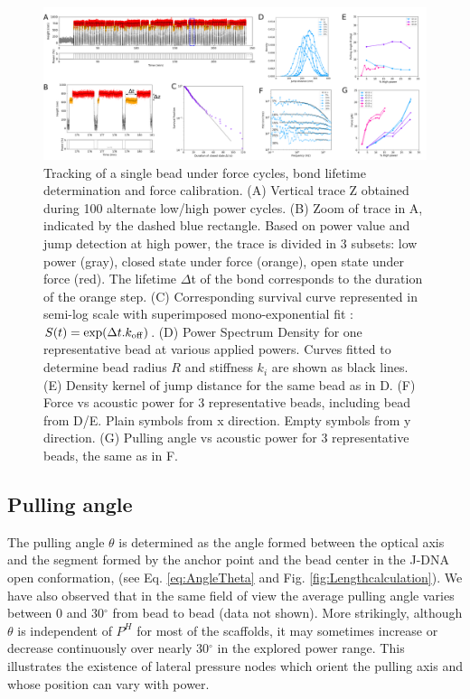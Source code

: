 \documentclass{biophys-new}
\begin{document}
\begin{figure}[hbt!]
	\centering
	\includegraphics[width=1\linewidth]{Figures/fig2.png}
	\caption{Tracking of a single bead under force cycles, bond lifetime determination and force calibration. (A) Vertical trace Z obtained during 100 alternate low/high power cycles. (B) Zoom of trace in A, indicated by the dashed blue rectangle. Based on power value and jump detection at high power, the trace is divided in 3 subsets: low power (gray), closed state under force (orange), open state under force (red). The lifetime $\Delta$t of the bond corresponds to the duration of the orange step. (C) Corresponding survival curve represented in semi-log scale with superimposed mono-exponential fit : $S(t) = \exp(\Delta t. k_{{\rm off}})$. (D) Power Spectrum Density for one representative bead at various applied powers. Curves fitted to determine bead radius $R$ and stiffness $k_i$ are shown as black lines. (E) Density kernel of jump distance for the same bead as in D. (F) Force vs acoustic power for 3 representative beads, including bead from D/E. Plain symbols from x direction. Empty symbols from y direction. (G) Pulling angle vs acoustic power for 3 representative beads, the same as in F.}
	\label{fig:lifetime}
\end{figure}


\subsection*{Pulling angle}

The pulling angle $\theta$ is determined as the angle formed between the optical axis and the segment formed by the anchor point and the bead center in the J-DNA open conformation, (see Eq. \ref{eq:AngleTheta} and Fig. \ref{fig:Lengthcalculation}).
We have also observed that in the same field of view the average pulling angle varies between 0 and 30$^{\circ}$ from bead to bead (data not shown). More strikingly, although $\theta$ is independent of $P^H$ for most of the scaffolds, it may sometimes increase or decrease continuously over nearly 30$^{\circ}$ in the explored power range. %
This illustrates the existence of lateral pressure nodes which orient the pulling axis and whose position can vary with power.
\end{document}
